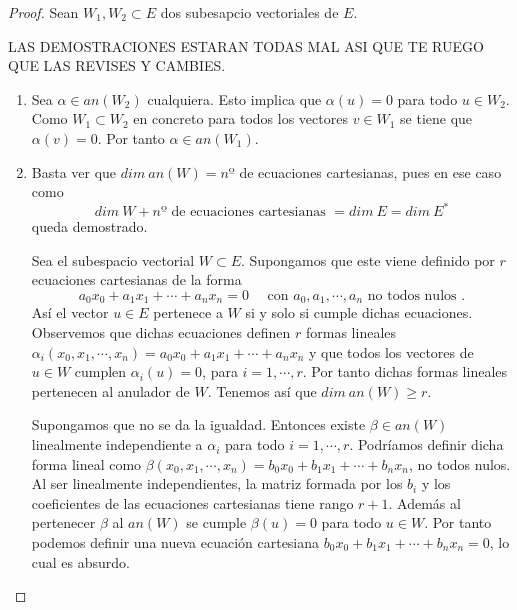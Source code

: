 \begin{proof}
	Sean $W_1,W_2\subset E$ dos subesapcio vectoriales de $E$.
	
	LAS DEMOSTRACIONES ESTARAN TODAS MAL ASI QUE TE RUEGO QUE LAS REVISES Y CAMBIES.
	\begin{enumerate}
		\item Sea $\alpha\in an(W_2)$ cualquiera. Esto implica que $\alpha(u)=0$ para todo $u\in W_2$. Como $W_1\subset W_2$ en concreto para todos los vectores $v\in W_1$ se tiene que $\alpha(v)=0$. Por tanto $\alpha\in an(W_1)$.
		
		\item Basta ver que $dim \ an(W)= nº$ de ecuaciones cartesianas, pues en ese caso como 
		\begin{equation*}
		dim \ W+ nº\text{ de ecuaciones cartesianas }=dim \ E=dim \ E^*
		\end{equation*}
		queda demostrado.
		
		Sea el subespacio vectorial $W\subset E$. Supongamos que este viene definido por $r$ ecuaciones cartesianas de la forma
		\begin{equation*}
			a_0x_0+a_1x_1+\cdots +a_nx_n=0 \quad \text{ con } a_0,a_1,\cdots, a_n \text{ no todos nulos }.
		\end{equation*}
		Así  el vector $u\in E$ pertenece a $W$ si y solo si cumple dichas ecuaciones. Observemos que dichas ecuaciones definen $r$ formas lineales $\alpha_i(x_0,x_1,\cdots, x_n)=a_0x_0+a_1x_1+\cdots +a_nx_n$ y que todos los vectores de $u\in W$ cumplen $\alpha_i(u)=0$, para $i=1,\cdots, r$. Por tanto dichas formas lineales pertenecen al anulador de $W$. Tenemos así que $dim \ an(W)\ge r$.
		
		Supongamos que no se da la igualdad. Entonces existe $\beta\in an(W)$ linealmente independiente a $\alpha_i$ para todo $i=1,\cdots, r$. Podríamos definir dicha forma lineal como $\beta(x_0,x_1,\cdots, x_n)=b_0x_0+b_1x_1+\cdots +b_nx_n$, no todos nulos. Al ser linealmente independientes, la matriz formada por los $b_i$ y los coeficientes de las ecuaciones cartesianas tiene rango $r+1$. Además al pertenecer $\beta$ al $an(W)$ se cumple $\beta(u)=0$ para todo $u\in W$. Por tanto podemos definir una nueva ecuación cartesiana $b_0x_0+b_1x_1+\cdots +b_nx_n=0$, lo cual es absurdo.
		

\end{enumerate}
\end{proof}

